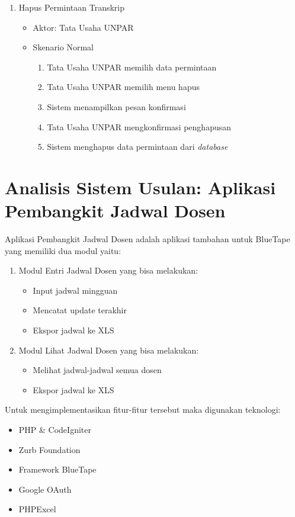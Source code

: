 \begin{enumerate}
	\item Hapus Permintaan Transkrip
	\begin{itemize}
		\item Aktor: Tata Usaha UNPAR
		\item Skenario Normal
			\begin{enumerate}[1.]
				\item Tata Usaha UNPAR memilih data permintaan
				\item Tata Usaha UNPAR memilih menu hapus
				\item Sistem menampilkan pesan konfirmasi
				\item Tata Usaha UNPAR mengkonfirmasi penghapusan
				\item Sistem menghapus data permintaan dari \textit{database}
			\end{enumerate}
	\end{itemize}

	
\end{enumerate}

\section{Analisis Sistem Usulan: Aplikasi Pembangkit Jadwal Dosen}
Aplikasi Pembangkit Jadwal Dosen adalah aplikasi tambahan untuk BlueTape yang memiliki dua modul yaitu:
\begin{enumerate}
	\item Modul Entri Jadwal Dosen yang bisa melakukan:
		\begin{itemize}
			\item Input jadwal mingguan
			\item Mencatat update terakhir
			\item Ekspor jadwal ke XLS
		\end{itemize}
	\item Modul Lihat Jadwal Dosen yang bisa melakukan:
		\begin{itemize}
			\item Melihat jadwal-jadwal semua dosen
			\item Ekspor jadwal ke XLS
		\end{itemize}
\end{enumerate}
Untuk mengimplementasikan fitur-fitur tersebut maka digunakan teknologi:
\begin{itemize}
	\item PHP \& CodeIgniter
	\item Zurb Foundation
	\item Framework BlueTape
	\item Google OAuth
	\item PHPExcel
\end{itemize}

